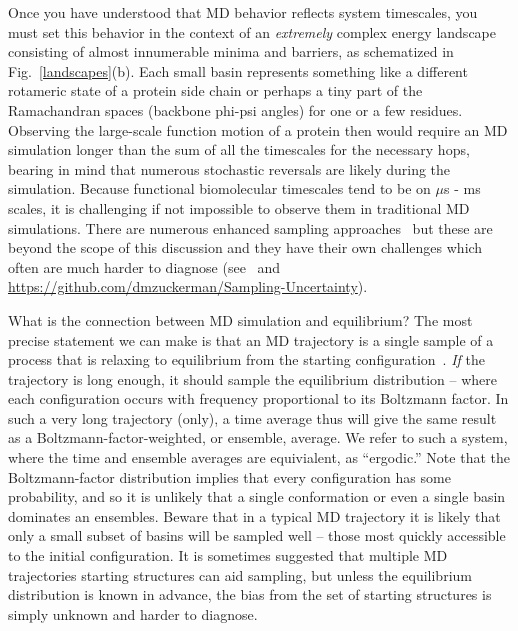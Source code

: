 \documentclass[9pt,bestpractices]{livecoms}
\begin{document}
Once you have understood that MD behavior reflects system timescales, you must set this behavior in the context of an \emph{extremely} complex energy landscape consisting of almost innumerable minima and barriers, as schematized in Fig.\ \ref{landscapes}(b).  
Each small basin represents something like a different rotameric state of a protein side chain or perhaps a tiny part of the Ramachandran spaces (backbone phi-psi angles) for one or a few residues.  
Observing the large-scale function motion of a protein then would require an MD simulation longer than the sum of all the timescales for the necessary hops, bearing in mind that numerous stochastic reversals are likely during the simulation.  
Because functional biomolecular timescales tend to be on $\mu$s - ms scales, it is challenging if not impossible to observe them in traditional MD simulations.  
There are numerous enhanced sampling approaches~\cite{Zuckerman:2011:Annu.Rev.Biophys., Chong:2017:CurrentOpinioninStructuralBiology} but these are beyond the scope of this discussion and they have their own challenges which often are much harder to diagnose (see~\cite{Grossfield:2009:AnnuRepComputChem} and  \url{https://github.com/dmzuckerman/Sampling-Uncertainty}).

What is the connection between MD simulation and equilibrium?  The most precise statement we can make is that an MD trajectory is a single sample of a process that is relaxing to equilibrium from the starting configuration~\cite{Zuckerman:2015:StatisticalBiophysicsBlog, Zuckerman:2010:}.  
\emph{If} the trajectory is long enough, it should sample the equilibrium distribution -- where each configuration occurs with frequency proportional to its Boltzmann factor.  
In such a very long trajectory (only), a time average thus will give the same result as a Boltzmann-factor-weighted, or ensemble, average.  
We refer to such a system, where the time and ensemble averages are equivialent, as ``ergodic.''
Note that the Boltzmann-factor distribution implies that every configuration has some probability, and so it is unlikely that a single conformation or even a single basin dominates an ensembles. 
Beware that in a typical MD trajectory it is likely that only a small subset of basins will be sampled well -- those most quickly accessible to the initial configuration.  
It is sometimes suggested that multiple MD trajectories starting structures can aid sampling, but unless the equilibrium distribution is known in advance, the bias from the set of starting structures is simply unknown and harder to diagnose.
\end{document}
